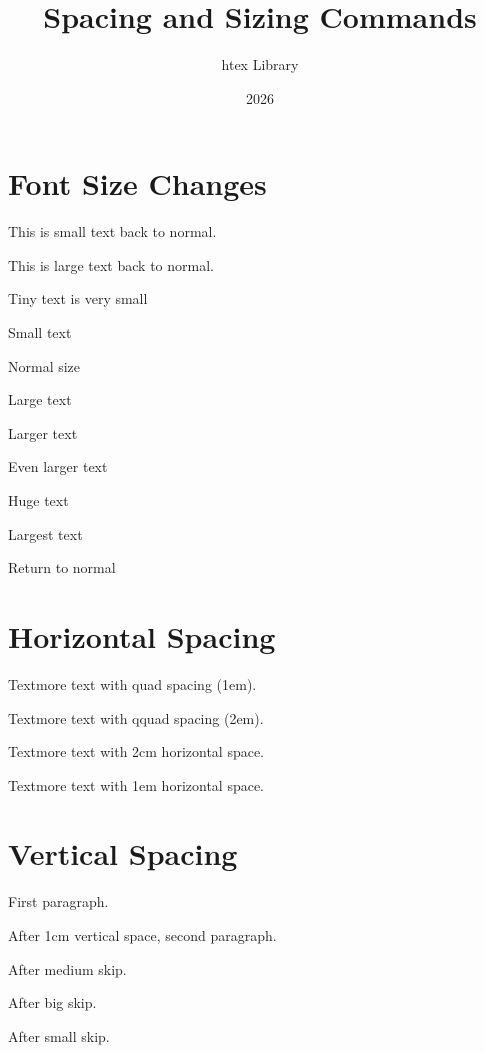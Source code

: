 \documentclass{article}
\title{Spacing and Sizing Commands}
\author{htex Library}
\date{2026}
\begin{document}
\maketitle

\section{Font Size Changes}

This is \small{small text} back to normal.

This is \Large{large text} back to normal.

\tiny{Tiny text is very small}

\small{Small text}

\normalsize{Normal size}

\large{Large text}

\Large{Larger text}

\LARGE{Even larger text}

\huge{Huge text}

\Huge{Largest text}

\normalsize{Return to normal}

\section{Horizontal Spacing}

Text\quad more text with quad spacing (1em).

Text\qquad more text with qquad spacing (2em).

Text\hspace{2cm}more text with 2cm horizontal space.

Text\hspace{1em}more text with 1em horizontal space.

\section{Vertical Spacing}

First paragraph.

\vspace{1cm}

After 1cm vertical space, second paragraph.

\medskip

After medium skip.

\bigskip

After big skip.

\smallskip

After small skip.
\end{document}
